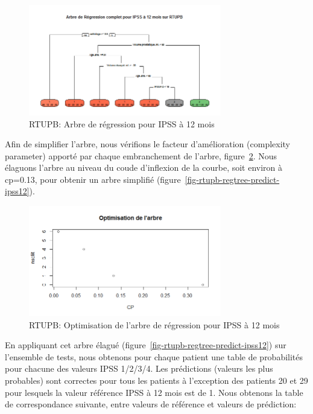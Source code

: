 \begin{figure}[H]
\centering
\includegraphics[width=0.75\textwidth]{../Fig/RTUPB/rtupb-full-regtree-ipss12.png}
\caption{RTUPB: Arbre de régression pour IPSS à 12 mois}
\label{fig-rtupb-full-regtree-ipss12}
\end{figure}

Afin de simplifier l'arbre, nous vérifions le facteur d'amélioration (complexity parameter) apporté par chaque embranchement de l'arbre, figure~\ref{fig-rtupb-regtree-optim-ipss12}. Nous élaguons l'arbre au niveau du coude d'inflexion de la courbe, soit environ à cp=0.13, pour obtenir un arbre simplifié  (figure~\ref{fig-rtupb-regtree-predict-ipss12}).

\begin{figure}[H]
\centering
\includegraphics[width=0.75\textwidth]{../Fig/RTUPB/rtupb-regtree-optim-ipss12.png}
\caption{RTUPB: Optimisation de l'arbre de régression pour IPSS à 12 mois}
\label{fig-rtupb-regtree-optim-ipss12}
\end{figure}

En appliquant cet arbre élagué  (figure~\ref{fig-rtupb-regtree-predict-ipss12}) sur l'ensemble de tests, nous obtenons pour chaque patient une table de probabilités pour chacune des valeurs IPSS 1/2/3/4. Les prédictions (valeurs
les plus probables) sont correctes pour tous les patients à l'exception des patients 20 et 29 pour lesquels la valeur référence IPSS à 12 mois est de 1.
Nous obtenons la table de correspondance suivante, entre valeurs de référence et valeurs de prédiction:

